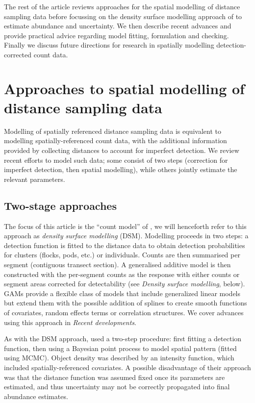 \documentclass[a4paper,12pt]{article}
\begin{document}
The rest of the article reviews approaches for the spatial modelling of distance sampling data before focussing on the density surface modelling approach of \cite{Hedley:2004et} to estimate abundance and uncertainty. We then describe recent advances and provide practical advice regarding model fitting, formulation and checking. Finally we discuss future directions for research in spatially modelling detection-corrected count data.


\section*{Approaches to spatial modelling of distance sampling data}
\label{s:approaches}

Modelling of spatially referenced distance sampling data is equivalent to modelling spatially-referenced count data, with the additional information provided by collecting distances to account for imperfect detection. We review recent efforts to model such data; some consist of two steps (correction for imperfect detection, then spatial modelling), while others jointly estimate the relevant parameters.

\subsection*{Two-stage approaches}

The focus of this article is the ``count model'' of \cite{Hedley:2004et}, we will henceforth refer to this approach as \textit{density surface modelling} (DSM). Modelling proceeds in two steps: a detection function is fitted to the distance data to obtain detection probabilities for clusters (flocks, pods, etc.) or individuals. Counts are then summarised per segment (contiguous transect section). A generalised additive model \cite[GAM; e.g.][]{Wood:2006wz} is then constructed with the per-segment counts as the response with either counts or segment areas corrected for detectability (see \textit{Density surface modelling}, below). GAMs provide a flexible class of models that include generalized linear models \citep[GLMs;][]{McCullagh:1989ux} but extend them with the possible addition of splines to create smooth functions of covariates, random effects terms or correlation structures. We cover advances using this approach in \textit{Recent developments}.

As with the DSM approach, \cite{Niemi:2010kx} used a two-step procedure: first fitting a detection function, then using a Bayesian point process to model spatial pattern (fitted using MCMC). Object density was described by an intensity function, which included spatially-referenced covariates. A possible disadvantage of their approach was that the distance function was assumed fixed once its parameters are estimated, and thus uncertainty may not be correctly propagated into final abundance estimates.
\end{document}
